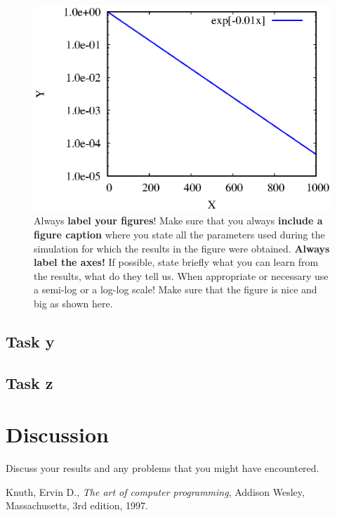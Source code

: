 \documentclass[11pt,a4paper]{article}
\begin{document}
\begin{figure}[ht]
\begin{center}
\includegraphics[scale=0.9]{figure.eps} 
\end{center}
\caption{Always \textbf{label your figures}! Make sure that you always \textbf{include a figure caption} where you state all the parameters used during the simulation for which the results in the figure were obtained. \textbf{Always label the axes!} If possible, state briefly what you can learn from the results, what do they tell us. When appropriate or necessary use a semi-log or a log-log scale! Make sure that the figure is nice and big as shown here.}
\label{fig:figure1}
\end{figure}


\subsection{Task y}
\subsection{Task z}

\section{Discussion}
Discuss your results and any problems that you might have encountered.

\begin{thebibliography}{99}

  Knuth, Ervin D.,
  \emph{The art of computer programming}, 
  Addison Wesley, Massachusetts,
  3rd edition,
  1997.

\end{thebibliography}
\end{document}
